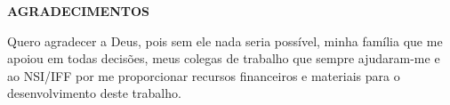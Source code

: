 \begin{center}
\textbf{AGRADECIMENTOS}
\end{center}

Quero agradecer a Deus, pois sem ele nada seria possível, minha família que me apoiou em todas decisões, meus colegas de trabalho que sempre ajudaram-me e ao NSI/IFF por me proporcionar recursos financeiros e materiais para o desenvolvimento deste trabalho.